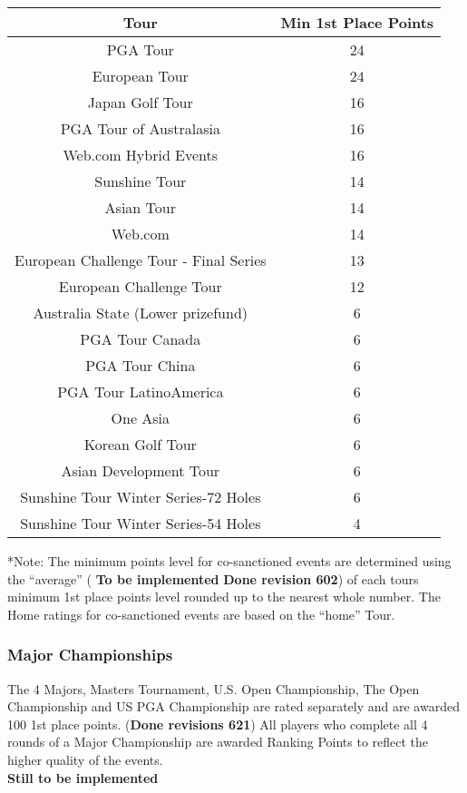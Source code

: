 \documentclass{article}
\begin{document}
\begin{center}
\begin{tabular}{ | c | c | }
\hline

Tour &	Min 1st Place Points\\
\hline
PGA Tour	&24\\
European Tour	&24\\
Japan Golf Tour&	16\\
PGA Tour of Australasia&	16\\
 Web.com Hybrid Events	&16\\
Sunshine Tour	&14\\
Asian Tour	&14\\
Web.com	&14\\
European Challenge Tour - Final Series	&13 \\
European Challenge Tour	&12\\
Australia State (Lower prizefund)&	6\\
PGA Tour Canada	&6\\
PGA Tour China	&6\\
PGA Tour LatinoAmerica&	6\\
One Asia	&6\\
Korean Golf Tour&	6\\
Asian Development Tour&	6\\
Sunshine Tour Winter Series-72 Holes&	6\\
Sunshine Tour Winter Series-54 Holes	&4\\
\hline
\end{tabular}
\end{center}

*Note: The minimum points level for co-sanctioned events are determined using the “average” (
\textbf{\color{orange} To be implemented} \textbf{Done revision 602}) of each tours minimum 1st place points level rounded up to the nearest whole number. The Home ratings for co-sanctioned events are based on the “home” Tour.

\subsubsection{Major Championships}

The 4 Majors, Masters Tournament, U.S. Open Championship, The Open Championship and US PGA Championship are rated separately and are awarded 100 1st place points. (\textbf{Done revisions 621}) All players who complete all 4 rounds of a Major Championship are awarded Ranking Points to reflect the higher quality of the events.\\
\textbf{\color{orange} Still to be implemented} 
\end{document}

